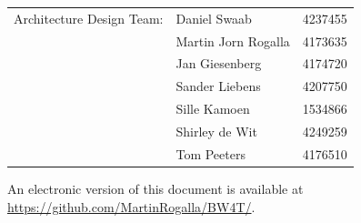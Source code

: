 \begin{titlepage}
\begin{center}
\begin{tabular}{lll}
    Architecture Design Team: & Daniel Swaab & 4237455\\
        & Martin Jorn Rogalla & 4173635\\
        & Jan Giesenberg & 4174720\\
        & Sander Liebens & 4207750\\
        & Sille Kamoen & 1534866\\
        & Shirley de Wit & 4249259\\
        & Tom Peeters & 4176510
\end{tabular}

\bigskip
\bigskip

\bigskip
\bigskip
An electronic version of this document is available at \url{https://github.com/MartinRogalla/BW4T/}.

\end{center}

\end{titlepage}

